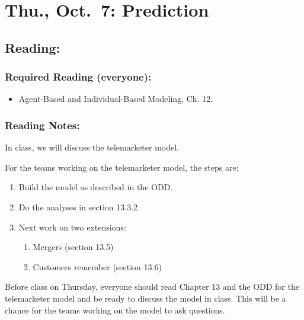\documentclass[
]{article}
\providecommand{\tightlist}{%
  \setlength{\itemsep}{0pt}\setlength{\parskip}{0pt}}
\begin{document}
\hypertarget{thu.-oct.-7-prediction}{%
\section{Thu., Oct.~7: Prediction}\label{thu.-oct.-7-prediction}}

\hypertarget{reading-12}{%
\subsection{Reading:}\label{reading-12}}

\hypertarget{required-reading-everyone-11}{%
\subsubsection{Required Reading
(everyone):}\label{required-reading-everyone-11}}

\begin{itemize}
\tightlist
\item
  Agent-Based and Individual-Based Modeling, Ch. 12.
\end{itemize}

\hypertarget{reading-notes-11}{%
\subsubsection{Reading Notes:}\label{reading-notes-11}}

In class, we will discuss the telemarketer model.

For the teams working on the telemarketer model, the steps are:

\begin{enumerate}
\def\labelenumi{\arabic{enumi}.}
\tightlist
\item
  Build the model as described in the ODD.
\item
  Do the analyses in section 13.3.2
\item
  Next work on two extensions:

  \begin{enumerate}
  \def\labelenumii{\arabic{enumii}.}
  \tightlist
  \item
    Mergers (section 13.5)
  \item
    Customers remember (section 13.6)
  \end{enumerate}
\end{enumerate}

Before class on Thursday, everyone should read Chapter 13 and the ODD
for the telemarketer model and be ready to discuss the model in class.
This will be a chance for the teams working on the model to ask
questions.
\end{document}
